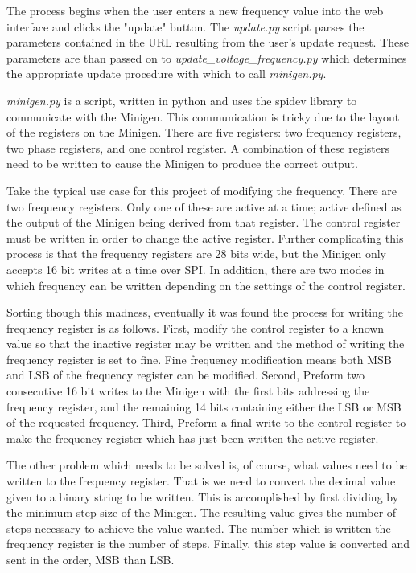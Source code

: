 \documentclass{article}	%
\begin{document}
\begin{multicols}{2}
The process begins when the user 
enters a new frequency value into the web interface
and clicks the "update" button.
The \textit{update.py} script parses 
the parameters contained in the URL
resulting from the user's update request.
These parameters are than
passed on to \textit{update\_voltage\_frequency.py}
which determines the appropriate update procedure 
with which to call \textit{minigen.py}.

\textit{minigen.py} is a script,
written in python and uses the spidev library
to communicate with the Minigen.
This communication is tricky due
to the layout of the registers on the Minigen.
There are five registers:
two frequency registers,
two phase registers, and
one control register.
A combination of these registers
need to be written to cause the Minigen to produce the correct output.

Take the typical use case for this project of
modifying the frequency.
There are two frequency registers.
Only one of these are active at a time;
active defined as the output of the Minigen being derived from that register.
The control register must be written in order to change the active register.
Further complicating this process is that the frequency registers are
28 bits wide, but the Minigen only accepts 16 bit writes at a time over SPI.
In addition, there are two modes in which frequency can be written
depending on the settings of the control register.

Sorting though this madness,
eventually it was found the process for writing the frequency register
is as follows.
First,
modify the control register to a known value so that
the inactive register may be written and
the method of writing the frequency register is set to fine.
Fine frequency modification means both MSB and LSB of 
the frequency register can be modified.
Second,
Preform two consecutive 16 bit writes to the Minigen with
the first bits addressing the frequency register, and
the remaining 14 bits containing either the LSB or MSB of the requested frequency.
Third,
Preform a final write to the control register to 
make the frequency register which has just been written
the active register.

The other problem which needs to be solved
is, of course, what values need to be written to the frequency register.
That is we need to convert the decimal value
given to a binary string to be written.
This is accomplished by first dividing by
the minimum step size of the Minigen.
The resulting value gives the number of steps necessary
to achieve the value wanted.
The number which is written the frequency register
is the number of steps.
Finally,
this step value is converted and sent in the order,
MSB than LSB.


\end{multicols}
\end{document}

